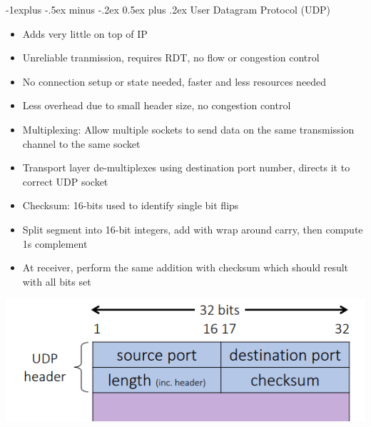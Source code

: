 \documentclass[10pt, landscape]{article}
\makeatletter
\renewcommand{\section}{\@startsection{section}{1}{0mm}%
                                {-1ex plus -.5ex minus -.2ex}%
                                {0.5ex plus .2ex}%
                                {\normalfont\large\bfseries}}
\renewcommand{\section}{\@startsection{section}{2}{0mm}%
                                {-1explus -.5ex minus -.2ex}%
                                {0.5ex plus .2ex}%
                                {\normalfont\normalsize\bfseries}}
\makeatother
\begin{document}
\begin{multicols*}{3}
\section{User Datagram Protocol (UDP)}
\begin{itemize}
    \item Adds very little on top of IP
    \item Unreliable tranmission, requires RDT, no flow or congestion control
    \item No connection setup or state needed, faster and less resources needed
    \item Less overhead due to small header size, no congestion control
    \item Multiplexing: Allow multiple sockets to send data on the same transmission channel to the same socket
    \item Transport layer de-multiplexes using destination port number, directs it to correct UDP socket
    \item Checksum: 16-bits used to identify single bit flips
    \item Split segment into 16-bit integers, add with wrap around carry, then compute 1s complement
    \item At receiver, perform the same addition with checksum which should result with all bits set
\end{itemize}
\begin{center}
    \includegraphics[width=0.9\linewidth]{UDP.png}
\end{center}


\end{multicols*}
\end{document}
